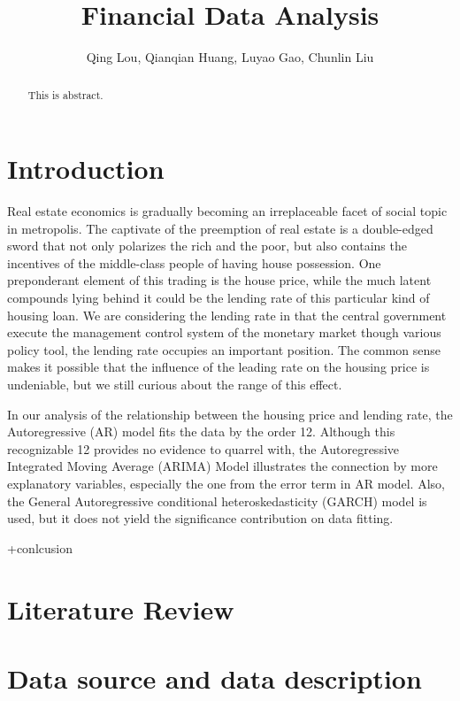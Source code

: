 \documentclass[12pt,letterpaper]{article}
\begin{document}
\title{\textbf{\Large Financial Data Analysis}}
\author{Qing Lou, Qianqian Huang, Luyao Gao, Chunlin Liu}
\date{}
\maketiitle 

\thispagestyle{empty}
\tableofcontents
\newpage
\clearpage

\begin{abstract}
This is abstract.
\end{abstract}

\section{Introduction}

Real estate economics is gradually becoming an irreplaceable facet of social topic in metropolis. 
The captivate of the preemption of real estate is a double-edged sword that not only polarizes the rich and the poor, but also contains the incentives of the middle-class people of having house possession.
One preponderant element of this trading is the house price, while the much latent compounds lying behind it could be the lending rate of this particular kind of housing loan.
We are considering the lending rate in that the central government execute the management control system of the monetary market though various policy tool, the lending rate occupies an important position.
The common sense makes it possible that the influence of the leading rate on the housing price is undeniable, but we still curious about the range of this effect.

In our analysis of the relationship between the housing price and lending rate, the Autoregressive (AR) model fits the data by the order 12. 
Although this recognizable 12 provides no evidence to quarrel with, the Autoregressive Integrated Moving Average (ARIMA) Model illustrates the connection by more explanatory variables, especially the one from the error term in AR model.
Also, the General Autoregressive conditional heteroskedasticity (GARCH) model is used, but it does not yield the significance contribution on data fitting.

+conlcusion

\section{Literature Review}

\section{Data source and data description}
\end{document}
